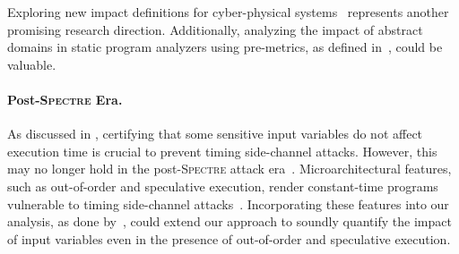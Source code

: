 Exploring new impact definitions for cyber-physical systems~ represents another promising research direction. Additionally, analyzing the impact of abstract domains in static program analyzers using pre-metrics, as defined in~, could be valuable.

\paragraph{Post-\textsc{Spectre} Era.}

As discussed in , certifying that some sensitive input variables do not affect execution time is crucial to prevent timing side-channel attacks. However, this may no longer hold in the post-\textsc{Spectre} attack era~. Microarchitectural features, such as out-of-order and speculative execution, render constant-time programs vulnerable to timing side-channel attacks~. Incorporating these features into our analysis, as done by~, could extend our approach to soundly quantify the impact of input variables even in the presence of out-of-order and speculative execution.
